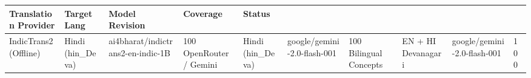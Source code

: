 \begin{tabular}{lllll}
\toprule
Translation Provider & Target Lang & Model Revision & Coverage & Status \\
\midrule
IndicTrans2 (Offline) & Hindi (hin_Deva) & ai4bharat/indictrans2-en-indic-1B & 100%
OpenRouter / Gemini & Hindi (hin_Deva) & google/gemini-2.0-flash-001 & 100%
Bilingual Concepts & EN + HI Devanagari & google/gemini-2.0-flash-001 & 100%
\bottomrule
\end{tabular}
